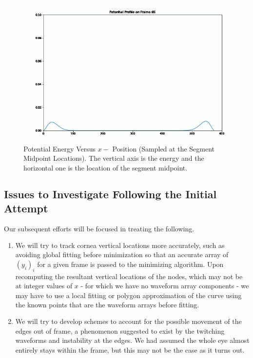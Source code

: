\documentclass[epjST]{svjour}
\begin{document}
\begin{figure}
    \centering
    \includegraphics[width=0.8\linewidth]{figures/minimization1/Screen Shot 2024-07-29 at 10.44.40 PM.png}
    \caption{Potential Energy Versus $x-$ Position (Sampled at the Segment Midpoint Locations). The vertical axis is the energy and the horizontal one is the location of the segment midpoint.}
    \label{fig:enter-label}
\end{figure}
\subsection{Issues to Investigate Following the Initial Attempt}
Our subsequent efforts will be focused in treating the following.
\begin{enumerate}
    \item We will try to track cornea vertical locations more accurately, such as avoiding global fitting before minimization so that an accurate array of $(y_i)_i$ for a given frame is passed to the minimizing algorithm. Upon recomputing the resultant vertical locations of the nodes, which may not be at integer values of $x$ - for which we have no waveform array components - we may have to use a local fitting or polygon approximation of the curve using the known points that are the waveform arrays before fitting.
    \\\item We will try to develop schemes to account for the possible movement of the edges out of frame, a phenomenon suggested to exist by the twitching waveforms and instability at the edges. We had assumed the whole eye almost entirely stays within the frame, but this may not be the case as it turns out.
\end{enumerate}
\end{document}

